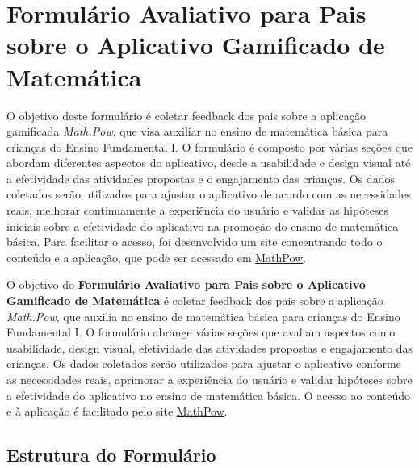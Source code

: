 \section{Formulário Avaliativo para Pais sobre o Aplicativo Gamificado de Matemática}

O objetivo deste formulário é coletar feedback dos pais sobre a aplicação gamificada \textit{Math.Pow}, que visa auxiliar no ensino de matemática básica para crianças do Ensino Fundamental I. O formulário é composto por várias seções que abordam diferentes aspectos do aplicativo, desde a usabilidade e design visual até a efetividade das atividades propostas e o engajamento das crianças. Os dados coletados serão utilizados para ajustar o aplicativo de acordo com as necessidades reais, melhorar continuamente a experiência do usuário e validar as hipóteses iniciais sobre a efetividade do aplicativo na promoção do ensino de matemática básica. Para facilitar o acesso, foi desenvolvido um site concentrando todo o conteúdo e a aplicação, que pode ser acessado em \href{https://mathpow.vercel.app/}{MathPow}.

O objetivo do \textbf{Formulário Avaliativo para Pais sobre o Aplicativo Gamificado de Matemática} é coletar feedback dos pais sobre a aplicação \textit{Math.Pow}, que auxilia no ensino de matemática básica para crianças do Ensino Fundamental I. O formulário abrange várias seções que avaliam aspectos como usabilidade, design visual, efetividade das atividades propostas e engajamento das crianças. Os dados coletados serão utilizados para ajustar o aplicativo conforme as necessidades reais, aprimorar a experiência do usuário e validar hipóteses sobre a efetividade do aplicativo no ensino de matemática básica. O acesso ao conteúdo e à aplicação é facilitado pelo site \href{https://mathpow.vercel.app/}{MathPow}.

\subsection*{Estrutura do Formulário}

